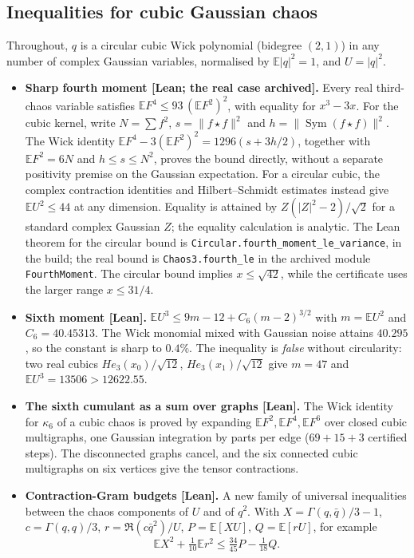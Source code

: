 \documentclass[11pt,a4paper]{article}
\newcommand{\E}{\mathbb{E}}
\newcommand{\lean}[1]{\texttt{\small #1}}
\begin{document}
\subsection{Inequalities for cubic Gaussian chaos}
Throughout, $q$ is a circular cubic Wick polynomial (bidegree $(2,1)$) in any number of complex Gaussian variables,
normalised by $\E|q|^2=1$, and $U=|q|^2$.
\begin{itemize}
\item \textbf{Sharp fourth moment [Lean; the real case archived].} Every real third-chaos variable satisfies $\E F^4\le93\,(\E F^2)^2$, with equality
 for $x^3-3x$. For the cubic kernel, write $N=\sum f^2$, $s=\|f\star f\|^2$ and
 $h=\|\operatorname{Sym}(f\star f)\|^2$. The Wick identity
 $\E F^4-3(\E F^2)^2=1296(s+3h/2)$, together with $\E F^2=6N$ and
 $h\le s\le N^2$, proves the bound directly, without a separate positivity premise
 on the Gaussian expectation. For a circular cubic, the complex contraction identities and Hilbert--Schmidt
 estimates instead give $\E U^2\le44$ at any dimension. Equality is attained by
 $Z(|Z|^2-2)/\sqrt2$ for a standard complex Gaussian $Z$; the equality calculation
 is analytic. The Lean theorem for the circular bound is \lean{Circular.fourth\_moment\_le\_variance}, in the build;
 the real bound is \lean{Chaos3.fourth\_le} in the archived module \lean{FourthMoment}.
 The circular bound implies $x\le\sqrt{42}$, while the certificate uses the larger range $x\le31/4$.
\item \textbf{Sixth moment [Lean].} $\E U^3\le9m-12+C_6(m-2)^{3/2}$ with $m=\E U^2$ and $C_6=40.45313$. The Wick monomial mixed
 with Gaussian noise attains $40.295$, so the constant is sharp to $0.4\%$. The inequality is \emph{false} without circularity:
 two real cubics $He_3(x_0)/\sqrt{12}$, $He_3(x_1)/\sqrt{12}$ give $m=47$ and $\E U^3=13506>12622.55$.
\item \textbf{The sixth cumulant as a sum over graphs [Lean].} The Wick identity for $\kappa_6$ of a cubic chaos is proved by
 expanding $\E F^2,\E F^4,\E F^6$ over closed cubic multigraphs, one Gaussian integration by parts per edge ($69+15+3$
 certified steps). The disconnected graphs cancel, and the six connected cubic multigraphs on six vertices give the tensor
 contractions.
\item \textbf{Contraction-Gram budgets [Lean].} A new family of universal inequalities between the chaos components of $U$
 and of $q^2$. With $X=\Gamma(q,\bar q)/3-1$, $c=\Gamma(q,q)/3$, $r=\Re(c\bar q^2)/U$, $P=\E[XU]$, $Q=\E[rU]$, for example
 \[
  \E X^2+\tfrac1{10}\E r^2\le\tfrac{34}{45}P-\tfrac1{18}Q .
\]
\end{itemize}
\end{document}
